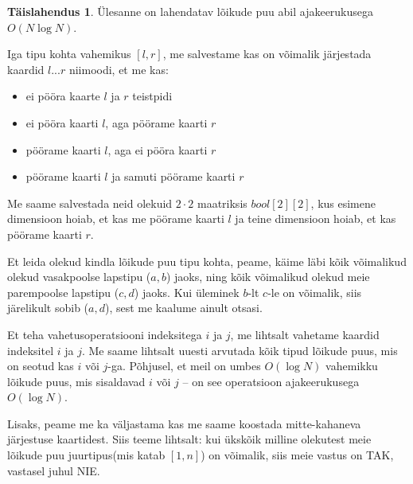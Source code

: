 \documentclass{trkut}
\theoremstyle{definition}
\newtheorem*{solution}{Täislahendus}
\begin{document}
\begin{solution}
Ülesanne on lahendatav lõikude puu abil ajakeerukusega $O(N\log N)$.

Iga tipu kohta vahemikus $[l, r]$, me salvestame kas on võimalik järjestada kaardid $l...r$ niimoodi, et me kas:
\begin{itemize}
    \item ei pööra kaarte $l$ ja $r$ teistpidi
    \item ei pööra kaarti $l$, aga pöörame kaarti $r$
    \item pöörame kaarti $l$, aga ei pööra kaarti $r$
    \item pöörame kaarti $l$ ja samuti pöörame kaarti $r$
\end{itemize}

Me saame salvestada neid olekuid $2\cdot2$ maatriksis $bool[2][2]$, kus esimene dimensioon hoiab, et kas me pöörame kaarti $l$ ja teine dimensioon hoiab, et kas pöörame kaarti $r$.

Et leida olekud kindla lõikude puu tipu kohta, peame, käime läbi kõik võimalikud olekud vasakpoolse lapstipu ($a, b$) jaoks, ning kõik võimalikud olekud meie parempoolse lapstipu ($c, d$) jaoks. Kui üleminek $b$-lt $c$-le on võimalik, siis järelikult sobib ($a, d$), sest me kaalume ainult otsasi.

Et teha vahetusoperatsiooni indeksitega $i$ ja $j$, me lihtsalt vahetame kaardid indeksitel $i$ ja $j$.
Me saame lihtsalt uuesti arvutada kõik tipud lõikude puus, mis on seotud kas $i$ või $j$-ga. 
Põhjusel, et meil on umbes $O(\log N)$ vahemikku lõikude puus, mis sisaldavad $i$ või $j$ -- on see operatsioon ajakeerukusega $O(\log N)$.

Lisaks, peame me ka väljastama kas me saame koostada mitte-kahaneva järjestuse kaartidest.
Siis teeme lihtsalt:
kui ükskõik milline olekutest meie lõikude puu juurtipus(mis katab $[1, n]$) on võimalik, siis meie vastus on TAK, vastasel juhul NIE.\parencite{POIS}
\end{solution}
\end{document}
